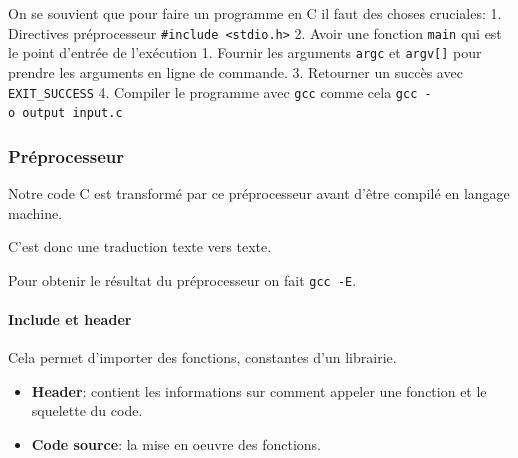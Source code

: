 On se souvient que pour faire un programme en C il faut des choses
cruciales: 1. Directives préprocesseur
\texttt{\#include\ \textless{}stdio.h\textgreater{}} 2. Avoir une
fonction \texttt{main} qui est le point d'entrée de l'exécution 1.
Fournir les arguments \texttt{argc} et \texttt{argv{[}{]}} pour prendre
les arguments en ligne de commande. 3. Retourner un succès avec
\texttt{EXIT\_SUCCESS} 4. Compiler le programme avec \texttt{gcc} comme
cela \texttt{gcc\ -o\ output\ input.c}

\begin{Shaded}
\begin{Highlighting}[]

\OperatorTok{(}\OperatorTok{,} \OperatorTok{*}\OperatorTok{[])\{}
\OperatorTok{(}\OperatorTok{);}

    \OperatorTok{;}
\OperatorTok{\}}
\end{Highlighting}
\end{Shaded}

\subsubsection{Préprocesseur}\label{pruxe9processeur}

Notre code C est transformé par ce préprocesseur avant d'être compilé en
langage machine.

C'est donc une traduction texte vers texte.

Pour obtenir le résultat du préprocesseur on fait \texttt{gcc\ -E}.

\paragraph{Include et header}\label{include-et-header}

Cela permet d'importer des fonctions, constantes d'un librairie.

\begin{itemize}
\tightlist
\item
  \textbf{Header}: contient les informations sur comment appeler une
  fonction et le squelette du code.
\item
  \textbf{Code source}: la mise en oeuvre des fonctions.
\end{itemize}

